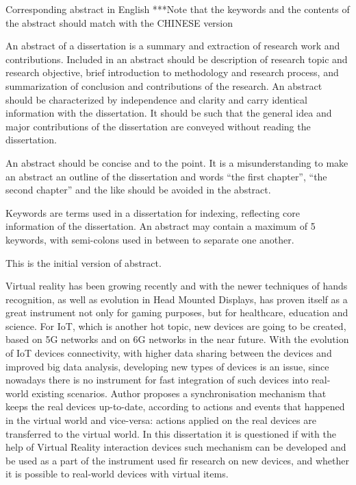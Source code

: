 \begin{abstract*}
  Corresponding abstract in English
  ***Note that the keywords and the contents of the abstract should match with the CHINESE version
  
  
  An abstract of a dissertation is a summary and extraction of research work and contributions.
  Included in an abstract should be description of research topic and research objective, brief introduction to methodology and research process, and summarization of conclusion and contributions of the research.
  An abstract should be characterized by independence and clarity and carry identical information with the dissertation.
  It should be such that the general idea and major contributions of the dissertation are conveyed without reading the dissertation.

  An abstract should be concise and to the point.
  It is a misunderstanding to make an abstract an outline of the dissertation and words “the first chapter”, “the second chapter” and the like should be avoided in the abstract.

  Keywords are terms used in a dissertation for indexing, reflecting core information of the dissertation.
  An abstract may contain a maximum of 5 keywords, with semi-colons used in between to separate one another.
  
  This is the initial version of abstract.
 
  
  Virtual reality has been growing recently and with the newer techniques of hands recognition, as well as evolution in Head Mounted Displays, has proven itself as a great instrument not only for gaming purposes, but for healthcare, education and science. For IoT, which is another hot topic, new devices are going to be created, based on 5G networks and on 6G networks in the near future. With the evolution of IoT devices connectivity, with higher data sharing between the devices and improved big data analysis, developing new types of devices is an issue, since nowadays there is no instrument for fast integration of such devices into real-world existing scenarios. Author proposes a synchronisation mechanism that keeps the real devices up-to-date, according to actions and events that happened in the virtual world and vice-versa: actions applied on the real devices are transferred to the virtual world. In this dissertation it is questioned if with the help of Virtual Reality interaction devices such mechanism can be developed and be used as a part of the instrument used fir research on new devices, and whether it is possible to real-world devices with virtual items.
  

\end{abstract*}
